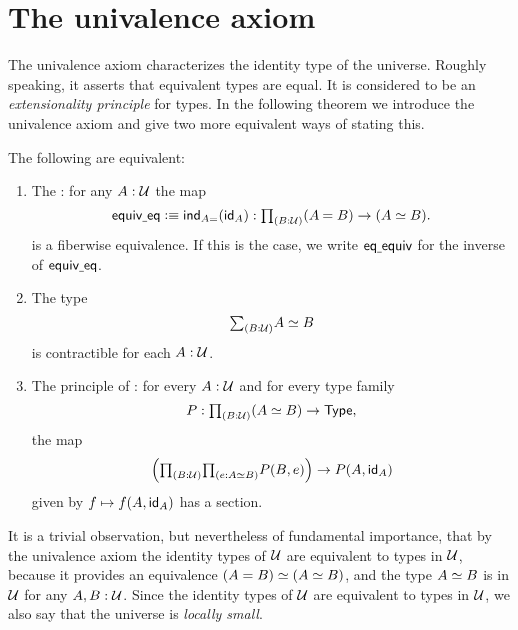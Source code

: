 \section{The univalence axiom}

The univalence axiom characterizes the identity type of the universe. Roughly speaking, it asserts that equivalent types are equal. It is considered to be an \emph{extensionality principle} for types. In the following theorem we introduce the univalence axiom and give two more equivalent ways of stating this.

\begin{prp}\label{thm:univalence}
The following are equivalent:
\begin{enumerate}
\item The : for any $A:\UU$ the map
\begin{equation*}
\equiveq\defeq \ind{A=}(\idfunc[A]) : \prd{B:\UU} (\id{A}{B})\to(\eqv{A}{B}).
\end{equation*}
is a fiberwise equivalence. If this is the case, we write
$\eqequiv$
for the inverse of $\equiveq$.
\item The type
\begin{equation*}
\sm{B:\UU}\eqv{A}{B}
\end{equation*}
is contractible for each $A:\UU$.
\item The principle of : for every $A:\UU$ and for every type family
\begin{equation*}
P:\prd{B:\UU} (\eqv{A}{B})\to \type,
\end{equation*}
the map
\begin{equation*}
\Big(\prd{B:\UU}{e:\eqv{A}{B}}P(B,e)\Big)\to P(A,\idfunc[A])
\end{equation*}
given by $f\mapsto f(A,\idfunc[A])$ has a section.\qedhere
\end{enumerate}
\end{prp}

It is a trivial observation, but nevertheless of fundamental importance, that by the univalence axiom the identity types of $\UU$ are equivalent to types in $\UU$, because it provides an equivalence $\eqv{(A=B)}{(\eqv{A}{B})}$, and the type $\eqv{A}{B}$ is in $\UU$ for any $A,B:\UU$. Since the identity types of $\UU$ are equivalent to types in $\UU$, we also say that the universe is \emph{locally small}.

